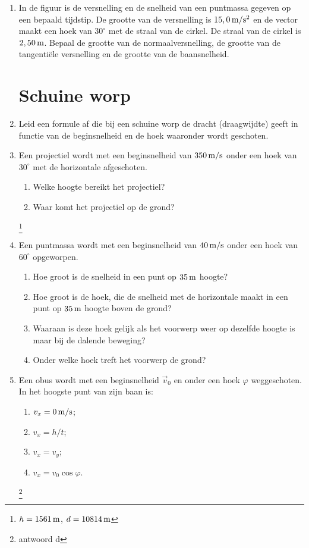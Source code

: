 \documentclass{ximera}
\begin{document}
\begin{enumerate}
\item In de figuur is de versnelling en de snelheid van een puntmassa gegeven op een bepaald tijdstip. De grootte van de versnelling is $15,0\rm\,m/s^2$ en de vector maakt een hoek van $30^\circ$ met de straal van de cirkel. De straal van de cirkel is $2,50\rm\,m$. Bepaal de grootte van de normaalversnelling, de grootte van de tangenti\"ele versnelling en de grootte van de baansnelheid.




\cleardoublepage

\section{Schuine worp}

\item Leid een formule af die bij een schuine worp de dracht
(draagwijdte) geeft in functie van de beginsnelheid en de hoek
waaronder wordt geschoten.

\item Een projectiel wordt met een beginsnelheid van $350\rm\,m/s$
onder een hoek van $30^\circ$ met de horizontale afgeschoten.
\begin{enumerate}
\item Welke hoogte bereikt het projectiel?
\item Waar komt het projectiel op de grond?
\end{enumerate}
\footnote{$h=1561\rm\,m$, $d=10814\rm\,m$}

\item Een puntmassa wordt met een beginsnelheid van $40\rm\,m/s$
onder een hoek van $60^{\circ}$ opgeworpen.
\begin{enumerate}
\item Hoe groot is de snelheid in een punt op $35\rm\,m$ hoogte?
\item Hoe groot is de hoek, die de snelheid met de horizontale maakt in een punt
op $35\rm\,m$ hoogte boven de grond?
\item Waaraan is deze hoek gelijk als het voorwerp weer op dezelfde
hoogte is maar bij de dalende beweging?
\item Onder welke hoek treft het voorwerp de grond?
\end{enumerate}

\item Een obus wordt met een beginsnelheid $\vec{v}_0$ en onder een
hoek $\varphi$ weggeschoten. In het hoogste punt van zijn baan is:
\begin{enumerate}
\item $v_x=0\rm\,m/s$;
\item $v_x=h/t$;
\item $v_x=v_y$;
\item $v_x=v_0\cos{\varphi}$.
\end{enumerate}
\footnote{antwoord d}


\end{enumerate}
\end{document}
